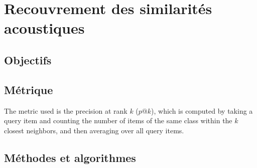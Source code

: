 \section{Recouvrement des similarités acoustiques}
\label{sec:ch6_ASSR}

\subsection{Objectifs}
\label{sec:ch6_objASSR}


\subsection{Métrique}
\label{sec:ch6_metriqueASSR}

The metric used is the precision at rank $k$ ($p@k$), which is computed by taking a query item and counting the number of items of the same class within the $k$ closest neighbors, and then averaging over all query items. 

\subsection{Méthodes et algorithmes}
\label{sec:ch6_algoASSR}








